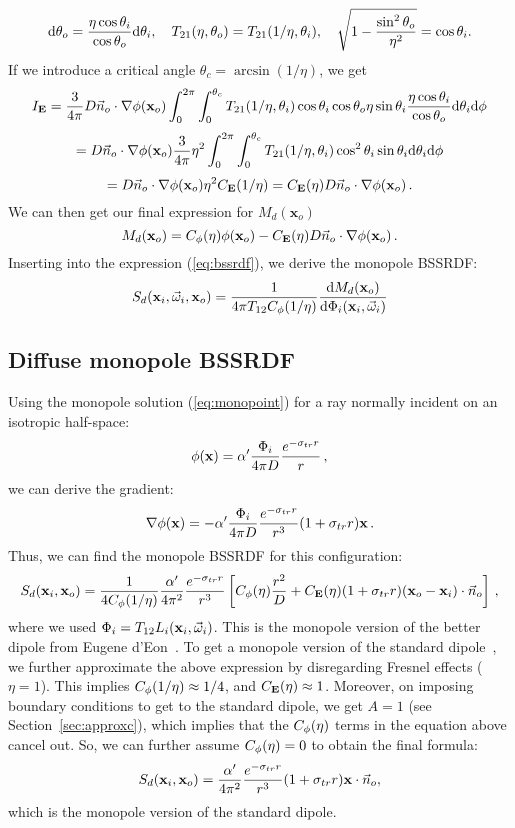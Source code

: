 \documentclass[10pt,a4paper]{article}
\begin{document}
$$
\text{d} \theta_o = \frac{\eta \cos\theta_i}{\cos\theta_o} \text{d} \theta_i,\ \ \ T_{21}(\eta,\theta_o) = T_{21}(1/\eta,\theta_i),\ \ \ \sqrt{1 - \frac{\sin^2\theta_o}{\eta^2}} = \cos\theta_i.
$$
If we introduce a critical angle $\theta_c = \arcsin(1/\eta)$, we get
$$
I_{\mathbf{E}} = \frac{3}{4\pi} D \vec{n}_o\cdot\nabla\phi(\mathbf{x}_o) \int_{0}^{2\pi}\int_{0}^{\theta_c} T_{21}(1/\eta,\theta_i) \cos\theta_i \cos \theta_o \eta \sin \theta_i \frac{\eta \cos\theta_i}{\cos\theta_o} \text{d} \theta_i \text{d} \phi
$$
$$
= D \vec{n}_o\cdot\nabla\phi(\mathbf{x}_o) \frac{3}{4\pi} \eta^2 \int_{0}^{2\pi}\int_{0}^{\theta_c} T_{21}(1/\eta,\theta_i) \cos^2\theta_i \sin \theta_i \text{d} \theta_i \text{d} \phi
$$
$$
= D \vec{n}_o\cdot\nabla\phi(\mathbf{x}_o) \eta^2 C_{\mathbf{E}}(1/\eta) = C_{\mathbf{E}}(\eta) D \vec{n}_o\cdot\nabla\phi(\mathbf{x}_o) \, .
$$
We can then get our final expression for  $M_d(\mathbf{x}_o)$
$$
M_d(\mathbf{x}_o) =  C_{\phi}(\eta) \phi(\mathbf{x}_o) - C_{\mathbf{E}}(\eta) D \vec{n}_o\cdot\nabla\phi(\mathbf{x}_o) \, .
$$
Inserting into the expression (\ref{eq:bssrdf}), we derive the monopole BSSRDF:
$$
S_d(\mathbf{x}_i, \vec{\omega}_i, \mathbf{x}_o)  =  \frac{1}{4\pi T_{12}C_{\phi}(1/\eta)} \frac{\text{d} M_d(\mathbf{x}_o)}{\text{d} \Phi_i(\mathbf{x}_i, \vec{\omega}_i)}
$$

\subsection{Diffuse monopole BSSRDF}

Using the monopole solution (\ref{eq:monopoint}) for a ray normally incident on an isotropic half-space:
$$
{\phi}(\mathbf{x}) = \alpha' \frac{\Phi_i}{4 \pi D} \frac{e^{-\sigma_{tr} r}}{r} \, ,
$$
we can derive the gradient:
$$
\nabla {\phi}(\mathbf{x}) =  -\alpha'\frac{\Phi_i}{4 \pi D} \frac{e^{-\sigma_{tr} r}}{r^3} (1 + \sigma_{tr} r) \mathbf{x} \, .
$$
Thus, we can find the monopole BSSRDF for this configuration:
$$
S_d(\mathbf{x}_i, \mathbf{x}_o)  = \frac{1}{4C_{\phi}(1/\eta)} \frac{\alpha'}{4 \pi^2} \frac{e^{-\sigma_{tr} r}}{r^3} \left[ C_{\phi}(\eta) \frac{r^2}{D} + C_{\mathbf{E}}(\eta) (1 + \sigma_{tr} r) (\mathbf{x}_o - \mathbf{x}_i) \cdot \vec{n}_o \right] \, ,
$$
where we used $\Phi_i = T_{12} L_i(\mathbf{x}_i, \vec{\omega}_i)$. This is the monopole version of the better dipole from Eugene d'Eon~\cite{deon12}. To get a monopole version of the standard dipole~\cite{farrell92,jensen01}, we further approximate the above expression by disregarding Fresnel effects ($\eta=1$). This implies $C_{\phi}(1/\eta) \approx 1/4$, and $C_{\mathbf{E}}(\eta) \approx 1$. Moreover, on imposing boundary conditions to get to the standard dipole, we get $A=1$ (see Section~\ref{sec:approxc}), which implies that the $C_{\phi}(\eta)$ terms in the equation above cancel out. So, we can further assume $C_{\phi}(\eta) = 0$ to obtain the final formula:
$$
S_d(\mathbf{x}_i, \mathbf{x}_o)  =  \frac{\alpha'}{4 \pi^2} \frac{e^{-\sigma_{tr} r}}{r^3} (1 + \sigma_{tr} r) \mathbf{x} \cdot \vec{n}_o,
$$
which is the monopole version of the standard dipole.
\end{document}
